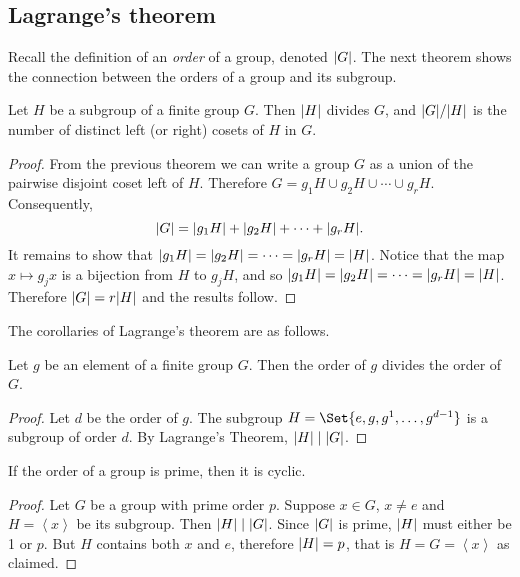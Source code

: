 \documentclass[main.tex]{subfiles}
\begin{document}
			\subsection{Lagrange’s theorem}
			Recall the definition of an \textit{order} of a group, denoted $\lvert G\rvert$. The next theorem shows the connection between the orders of a group and its subgroup.
				\begin{theorem} 
					Let $H$ be a subgroup of a finite group $G$. Then $\lvert H\rvert$ divides $G$, and $\lvert G\rvert/\lvert H\rvert$ is the number of distinct left (or right) cosets of $H$ in $G$.
				\end{theorem}
				\begin{proof}
					From the previous theorem we can write a group $G$ as a union of the pairwise disjoint coset left of $H$. Therefore $G = g_1H \cup g_2 H \cup \cdots \cup g_r H$. Consequently,
					\begin{equation*}
						\lvert G\rvert = \lvert g_1 H\rvert + \lvert g_2 H\rvert + \cdots + \lvert g_r H\rvert.
					\end{equation*}
					It remains to show that $\lvert g_1 H\rvert = \lvert g_2 H\rvert = \cdots = \lvert g_r H\rvert = \lvert H\rvert$. Notice that the map $x \mapsto g_j x$ is a bijection from $H$ to $g_j H$, and so $\lvert g_1 H\rvert = \lvert g_2 H\rvert = \cdots = \lvert g_r H\rvert = \lvert H\rvert$. Therefore $\lvert G\rvert = r\lvert H\rvert$ and the results follow.
				\end{proof}
			
			The corollaries of Lagrange's theorem are as follows.
			\begin{corollary}
					Let $g$ be an element of a finite group $G$. Then the order of $g$ divides the order of $G$.
			\end{corollary}
			\begin{proof}
				Let $d$ be the order of $g$. The subgroup $H = \Set{e, g, g^1, \ldots, g^{d-1}}$ is a subgroup of order $d$. By Lagrange's Theorem, $\lvert H\rvert \mid \lvert G\rvert$.
			\end{proof}
		
			\begin{corollary}
				If the order of a group is prime, then it is cyclic.
			\end{corollary}
				\begin{proof}
					Let $G$ be a group with prime order $p$. Suppose $x \in G$, $x \neq e$ and $H = \left\langle x \right\rangle $ be its subgroup. Then $\lvert H\rvert \mid \lvert G\rvert$. Since $\lvert G\rvert$ is prime, $\lvert H\rvert$ must either be 1 or $p$. But $H$ contains both $x$ and $e$, therefore $\lvert H\rvert = p$, that is $H = G = \left\langle x \right\rangle $ as claimed.
				\end{proof}
\end{document}
